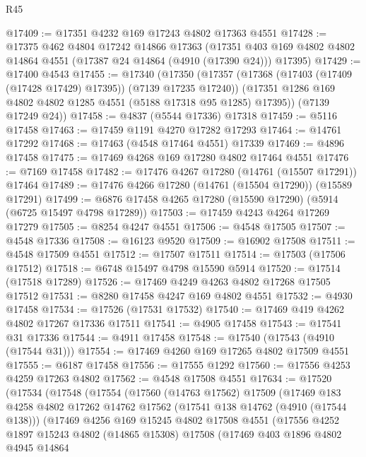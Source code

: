 \begin{lexlean}{R45}
\begin{coremodule}
@17409 := @17351 @4232 @169 @17243 @4802 @17363 @4551
@17428 := @17375
    @462
    @4804
    @17242
    @14866
    @17363
    (@17351 @403 @169 @4802 @4802 @14864 @4551 (@17387 @24 @14864 (@4910 (@17390 @24))) @17395)
@17429 := @17400 @4543
@17455 := @17340
    (@17350
      (@17357
        (@17368 (@17403 (@17409 (@17428 @17429) @17395)) (@7139 @17235 @17240))
        (@17351 @1286 @169 @4802 @4802 @1285 @4551 (@5188 @17318 @95 @1285) @17395))
      (@7139 @17249 @24))
@17458 := @4837 (@5544 @17336) @17318
@17459 := @5116 @17458
@17463 := @17459 @1191 @4270 @17282 @17293
@17464 := @14761 @17292
@17468 := @17463 (@4548 @17464 @4551) @17339
@17469 := @4896 @17458
@17475 := @17469 @4268 @169 @17280 @4802 @17464 @4551
@17476 := @7169 @17458
@17482 := @17476 @4267 @17280 (@14761 (@15507 @17291)) @17464
@17489 := @17476 @4266 @17280 (@14761 (@15504 @17290)) (@15589 @17291)
@17499 := @6876 @17458 @4265 @17280 (@15590 @17290) (@5914 (@6725 @15497 @4798 @17289))
@17503 := @17459 @4243 @4264 @17269 @17279
@17505 := @8254 @4247 @4551
@17506 := @4548 @17505
@17507 := @4548 @17336
@17508 := @16123 @9520
@17509 := @16902 @17508
@17511 := @4548 @17509 @4551
@17512 := @17507 @17511
@17514 := @17503 (@17506 @17512)
@17518 := @6748 @15497 @4798 @15590 @5914
@17520 := @17514 (@17518 @17289)
@17526 := @17469 @4249 @4263 @4802 @17268 @17505 @17512
@17531 := @8280 @17458 @4247 @169 @4802 @4551
@17532 := @4930 @17458
@17534 := @17526 (@17531 @17532)
@17540 := @17469 @419 @4262 @4802 @17267 @17336 @17511
@17541 := @4905 @17458
@17543 := @17541 @31 @17336
@17544 := @4911 @17458
@17548 := @17540 (@17543 (@4910 (@17544 @31)))
@17554 := @17469 @4260 @169 @17265 @4802 @17509 @4551
@17555 := @6187 @17458
@17556 := @17555 @1292
@17560 := @17556 @4253 @4259 @17263 @4802
@17562 := @4548 @17508 @4551
@17634 := @17520
    (@17534
      (@17548
        (@17554
          (@17560
            (@14763 @17562)
            @17509
            (@17469
              @183
              @4258
              @4802
              @17262
              @14762
              @17562
              (@17541 @138 @14762 (@4910 (@17544 @138)))
              (@17469
                @4256
                @169
                @15245
                @4802
                @17508
                @4551
                (@17556
                  @4252
                  @1897
                  @15243
                  @4802
                  (@14865 @15308)
                  @17508
                  (@17469
                    @403
                    @1896
                    @4802
                    @4945
                    @14864

\end{coremodule}
\end{lexlean}
